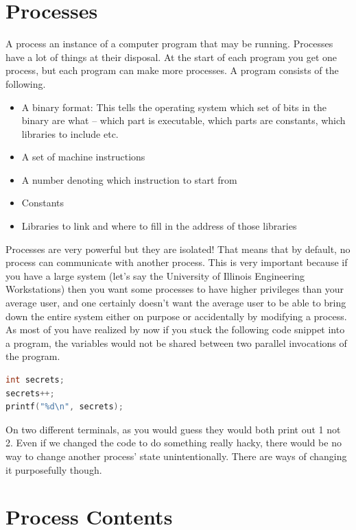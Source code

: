 \section{Processes}

A process an instance of a computer program that may be running.
Processes have a lot of things at their disposal.
At the start of each program you get one process, but each program can make more processes.
A program consists of the following.

\begin{itemize}
\item A binary format: This tells the operating system which set of bits in the binary are what -- which part is executable, which parts are constants, which libraries to include etc.
\item A set of machine instructions
\item A number denoting which instruction to start from
\item Constants
\item Libraries to link and where to fill in the address of those libraries
\end{itemize}

Processes are very powerful but they are isolated!
That means that by default, no process can communicate with another process.
This is very important because if you have a large system (let's say the University of Illinois Engineering Workstations) then you want some processes to have higher privileges than your average user, and one certainly doesn't want the average user to be able to bring down the entire system either on purpose or accidentally by modifying a process.
As most of you have realized by now if you stuck the following code snippet into a program, the variables would not be shared between two parallel invocations of the program.

\begin{lstlisting}[language=C]
int secrets;
secrets++;
printf("%d\n", secrets);
\end{lstlisting}

On two different terminals, as you would guess they would both print out 1 not 2.
Even if we changed the code to do something really hacky, there would be no way to change another process' state unintentionally.
There are ways of changing it purposefully though.

\section{Process Contents}

